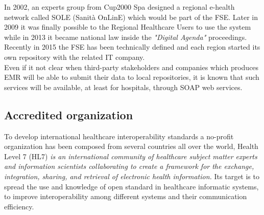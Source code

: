 In 2002, an experts group from Cup2000 Spa designed a regional e-health network called SOLE (Sanità OnLinE) which would be part of the FSE. Later in 2009 it was finally possible to the Regional Healthcare Users to use the system while in 2013 it became national law inside the \textit{"Digital Agenda"} proceedings.\\
Recently in 2015 the FSE has been technically defined and each region started its own repository with the related IT company.
\cite{smarthealth}\\
Even if it not clear when third-party stakeholders and companies which produces EMR will be able to submit their data to local repositories, it is known that such services will be available, at least for hospitals, through SOAP web services.

\subsection{Accredited organization}
To develop international healthcare interoperability standards a no-profit organization has been composed from several countries all over the world, Health Level 7 (HL7) \textit{is an international community of healthcare subject matter experts and information scientists collaborating to create a framework for the exchange, integration, sharing, and retrieval of electronic health information.} Its target is to spread the use and knowledge of open standard in healthcare informatic systems, to improve interoperability among different systems and their communication efficiency. \cite{hl7}


